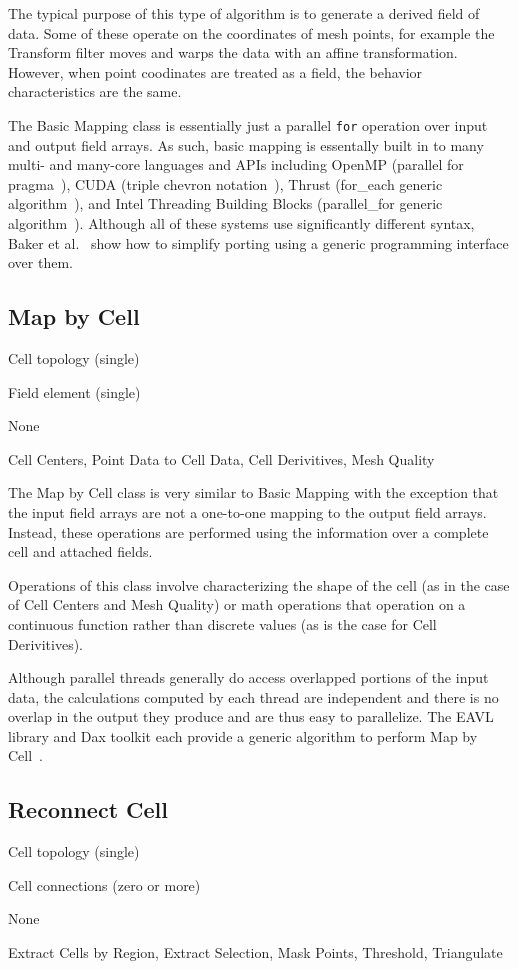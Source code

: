 \documentclass{sig-alternate}
\newcommand*{\lcite}[1]{~\cite{#1}}
\newcommand*{\scite}[1]{~\cite{#1}}
\newcommand{\etal}{et al.}
\newcommand{\algclass}[1]{\textsf{#1}}
\newcommand{\alg}[1]{#1}
\newcommand{\algorithmclasssection}[1]{\subsection*{#1}}
\newcommand{\algorithmclass}[5]{
  \algorithmclasssection{#1} %
  \begin{description}[leftmargin=9em,style=nextline,noitemsep]
    \raggedright
  \item[Input] #2
  \item[Output] #3
  \item[Interdependence] #4
  \item[Algorithms] #5
  \end{description}
}
\begin{document}
The typical purpose of this type of algorithm is to generate a derived
field of data. Some of these operate on the coordinates of mesh points, for
example the \alg{Transform} filter moves and warps the data with an affine
transformation. However, when point coodinates are treated as a field, the
behavior characteristics are the same.

The \algclass{Basic Mapping} class is essentially just a parallel
\texttt{for} operation over input and output field arrays. As such, basic
mapping is essentally built in to many multi- and many-core languages and
APIs including OpenMP (parallel for pragma\lcite{Quinn2004}), CUDA (triple
chevron notation\lcite{Sanders2011}), Thrust (for\_each generic
algorithm\lcite{Thrust}), and Intel Threading Building Blocks
(parallel\_for generic algorithm\lcite{TBB}). Although all of these systems
use significantly different syntax, Baker \etal\scite{Baker2010} show how
to simplify porting using a generic programming interface over them.


\algorithmclass{Map by Cell}
               {Cell topology (single)} %
               {Field element (single)} %
               {None} %
               {Cell Centers, Point Data to Cell Data, Cell Derivitives,
                 Mesh Quality}

\noindent
The \algclass{Map by Cell} class is very similar to \algclass{Basic
  Mapping} with the exception that the input field arrays are not a
one-to-one mapping to the output field arrays. Instead, these operations
are performed using the information over a complete cell and attached
fields.

Operations of this class involve characterizing the shape of the cell (as
in the case of \alg{Cell Centers} and \alg{Mesh Quality}) or math
operations that operation on a continuous function rather than discrete
values (as is the case for \alg{Cell Derivitives}).

Although parallel threads generally do access overlapped portions of the
input data, the calculations computed by each thread are independent and
there is no overlap in the output they produce and are thus easy to
parallelize. The EAVL library and Dax toolkit each provide a generic
algorithm to perform \algclass{Map by Cell}\lcite{EAVL,Moreland2011:LDAV}.


\algorithmclass{Reconnect Cell}
               {Cell topology (single)} %
               {Cell connections (zero or more)} %
               {None} %
               {Extract Cells by Region, Extract Selection, Mask Points,
                 Threshold, Triangulate}
\end{document}
